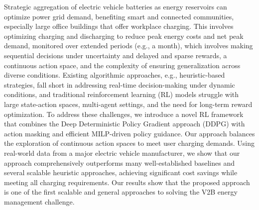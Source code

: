 {\color{black} 
Strategic aggregation of electric vehicle batteries as energy reservoirs can optimize power grid demand, benefiting smart and connected communities, especially large office buildings that offer workplace charging. 
This involves optimizing charging and discharging to reduce peak energy costs and net peak demand, monitored over extended periods (e.g., a month), which involves making sequential decisions under uncertainty and delayed and sparse rewards, a continuous action space, and the complexity of ensuring generalization across diverse conditions. Existing 
algorithmic approaches, e.g., heuristic-based strategies, fall short in addressing real-time decision-making under dynamic conditions, and traditional reinforcement learning (RL) models struggle with large state-action spaces, multi-agent settings, and the need for long-term reward optimization. To address these challenges, we introduce a novel RL framework that combines the Deep Deterministic Policy Gradient approach (DDPG) with action masking and efficient MILP-driven policy guidance. Our approach balances the exploration of continuous action spaces to meet user charging demands. 
Using real-world data from a major electric vehicle manufacturer, we show that our approach comprehensively outperforms many well-established baselines and several scalable heuristic approaches, 
achieving significant cost savings while meeting all charging requirements. Our results show that the proposed approach is one of the first scalable and general approaches to solving the V2B energy management challenge.
}
